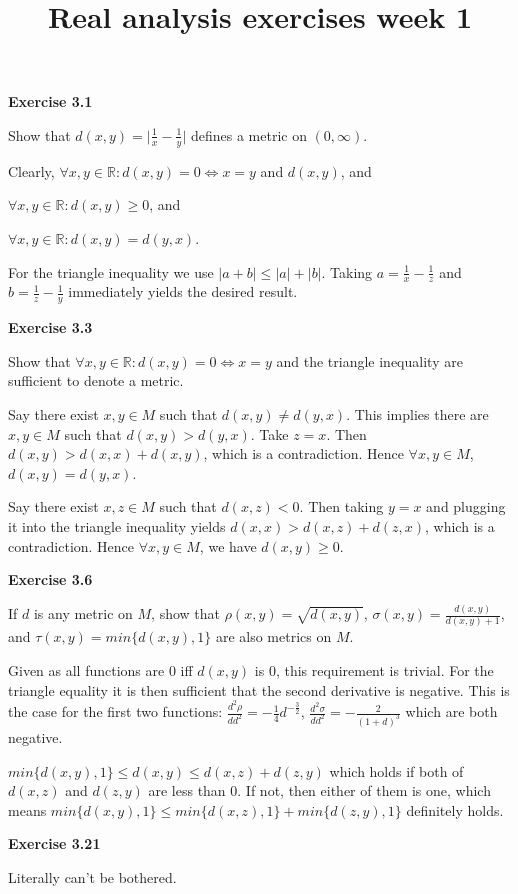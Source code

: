 \documentclass{article}
\newenvironment{myindentpar}[1]%
 {\begin{list}{}%
         {\setlength{\leftmargin}{#1}}%
         \item[]%
 }
 {\end{list}}
\begin{document}
\title{Real analysis exercises week 1} \maketitle


\textbf{Exercise 3.1}
\begin{myindentpar}{1cm}
Show that $d(x, y)=\lvert \frac{1}{x} - \frac{1}{y}\rvert$ defines a metric on $(0,\infty)$.

	Clearly, $\forall x, y \in \mathbb{R}: d(x, y)=0\iff x=y$ and $d(x, y)$, and

	$\forall x, y \in \mathbb{R}: d(x, y) \geq 0$, and

	$\forall x, y \in \mathbb{R}: d(x, y) = d(y, x)$.

	For the triangle inequality we use $\lvert a + b\rvert \leq \lvert a \rvert + \lvert b \rvert$.
	Taking $a = \frac{1}{x} - \frac{1}{z}$ and $b = \frac{1}{z} - \frac{1}{y}$ immediately yields the desired result.

\end{myindentpar}

\textbf{Exercise 3.3}
\begin{myindentpar}{1cm}
	Show that $\forall x, y \in \mathbb{R}: d(x, y)=0 \iff x=y$ and the triangle inequality are sufficient to denote a metric.

	Say there exist $x, y \in M$ such that $d(x, y)\neq d(y,x)$. This implies there are $x, y \in M$ such that $d(x,y) > d(y,x)$.
	Take $z=x$. Then $d(x,y) > d(x,x) + d(x,y)$, which is a contradiction. Hence $\forall x, y \in M$, $d(x,y)=d(y,x)$.

	Say there exist $x, z \in M$ such that $d(x,z) < 0$. Then taking $y=x$ and plugging it into the triangle inequality yields  $d(x,x) > d(x,z) + d(z,x)$,
	which is a contradiction. Hence $\forall x, y \in M$, we have $d(x,y) \geq 0$.

\end{myindentpar}

\textbf{Exercise 3.6}
\begin{myindentpar}{1cm}

	If $d$ is any metric on $M$, show that $\rho(x, y)=\sqrt{d(x,y)}$, $\sigma(x, y)=\frac{d(x, y)}{d(x, y) + 1}$, and $\tau(x, y)=min\{d(x,y), 1\}$ are also metrics on $M$.

	Given as all functions are $0$ iff $d(x,y)$ is $0$, this requirement is trivial. For the triangle equality it is then sufficient that the second derivative is negative.
	This is the case for the first two functions: $\frac{d^2 \rho}{dd^2}=-\frac{1}{4}d^{-\frac{3}{2}}$, $\frac{d^2 \sigma}{dd^2}=-\frac{2}{(1+d)^3}$ which are both negative.

	$min\{d(x,y), 1\}\leq d(x,y) \leq d(x,z) + d(z, y)$ which holds if both of $d(x,z)$ and $d(z,y)$ are less than $0$. If not, then either of them is one, which means
	$min\{d(x,y), 1\}\leq min\{d(x, z), 1\} + min\{d(z, y), 1\}$ definitely holds.

\end{myindentpar}

\textbf{Exercise 3.21}

Literally can't be bothered.
\end{document}

